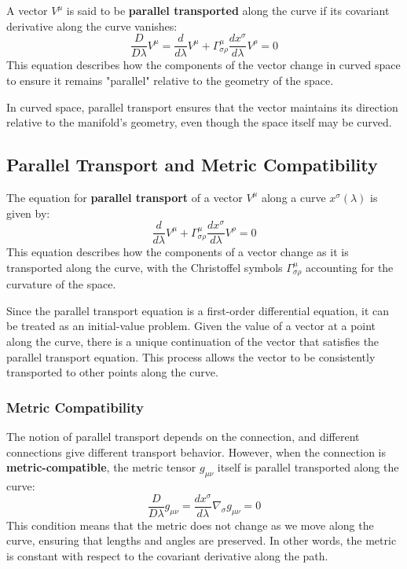 \documentclass[11pt,letterpaper]{book}
\begin{document}
A vector \( V^\mu \) is said to be \textbf{parallel transported} along the curve if its covariant derivative along the curve vanishes:
\[
\frac{D}{D\lambda} V^\mu = \frac{d}{d\lambda} V^\mu + \Gamma^\mu_{\sigma\rho} \frac{dx^\sigma}{d\lambda} V^\rho = 0
\]
This equation describes how the components of the vector change in curved space to ensure it remains "parallel" relative to the geometry of the space.

In curved space, parallel transport ensures that the vector maintains its direction relative to the manifold's geometry, even though the space itself may be curved.

\subsection{Parallel Transport and Metric Compatibility}

The equation for \textbf{parallel transport} of a vector \( V^\mu \) along a curve \( x^\sigma(\lambda) \) is given by:
\[
\frac{d}{d\lambda} V^\mu + \Gamma^\mu_{\sigma\rho} \frac{dx^\sigma}{d\lambda} V^\rho = 0
\]
This equation describes how the components of a vector change as it is transported along the curve, with the Christoffel symbols \( \Gamma^\mu_{\sigma\rho} \) accounting for the curvature of the space.

Since the parallel transport equation is a first-order differential equation, it can be treated as an initial-value problem. Given the value of a vector at a point along the curve, there is a unique continuation of the vector that satisfies the parallel transport equation. This process allows the vector to be consistently transported to other points along the curve.

\subsubsection{Metric Compatibility}
The notion of parallel transport depends on the connection, and different connections give different transport behavior. However, when the connection is \textbf{metric-compatible}, the metric tensor \( g_{\mu\nu} \) itself is parallel transported along the curve:
\[
\frac{D}{D\lambda} g_{\mu\nu} = \frac{dx^\sigma}{d\lambda} \nabla_\sigma g_{\mu\nu} = 0
\]
This condition means that the metric does not change as we move along the curve, ensuring that lengths and angles are preserved. In other words, the metric is constant with respect to the covariant derivative along the path.
\end{document}
